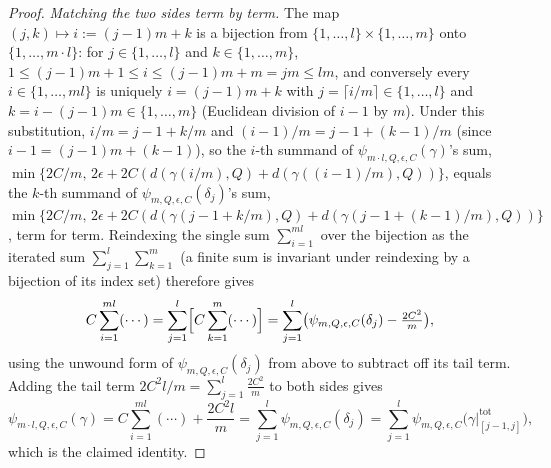 \begin{proof}
  \emph{Matching the two sides term by term.} The map $(j,k) \mapsto i := (j-1)m+k$ is a bijection
  from $\{1,\dotsc,l\}\times\{1,\dotsc,m\}$ onto $\{1,\dotsc,m\cdot l\}$: for $j\in\{1,\dotsc,l\}$
  and $k\in\{1,\dotsc,m\}$, $1 \le (j-1)m+1 \le i \le (j-1)m+m = jm \le lm$, and conversely every
  $i\in\{1,\dotsc,ml\}$ is uniquely $i=(j-1)m+k$ with $j = \lceil i/m \rceil \in \{1,\dotsc,l\}$ and
  $k = i-(j-1)m \in \{1,\dotsc,m\}$ (Euclidean division of $i-1$ by $m$). Under this substitution,
  $i/m = j-1+k/m$ and $(i-1)/m = j-1+(k-1)/m$ (since $i-1=(j-1)m+(k-1)$), so the $i$-th summand of
  $\psi_{m\cdot l,Q,\epsilon,C}(\gamma)$'s sum,
  $\min\{2C/m,\, 2\epsilon+2C(d(\gamma(i/m),Q)+d(\gamma((i-1)/m),Q))\}$, equals the $k$-th summand of
  $\psi_{m,Q,\epsilon,C}(\delta_j)$'s sum,
  $\min\{2C/m,\,2\epsilon+2C(d(\gamma(j-1+k/m),Q)+d(\gamma(j-1+(k-1)/m),Q))\}$, term for term.
  Reindexing the single sum $\sum_{i=1}^{ml}$ over the bijection as the iterated sum
  $\sum_{j=1}^l\sum_{k=1}^m$ (a finite sum is invariant under reindexing by a bijection of its index
  set) therefore gives
  \[
    C\sum_{i=1}^{ml}(\cdots) = \sum_{j=1}^l \Bigl[C\sum_{k=1}^m(\cdots)\Bigr]
    = \sum_{j=1}^l \bigl(\psi_{m,Q,\epsilon,C}(\delta_j) - \tfrac{2C^2}{m}\bigr)
    ,
  \]
  using the unwound form of $\psi_{m,Q,\epsilon,C}(\delta_j)$ from above to subtract off its tail
  term. Adding the tail term $2C^2l/m = \sum_{j=1}^l \tfrac{2C^2}{m}$ to both sides gives
  \[
    \psi_{m\cdot l,Q,\epsilon,C}(\gamma) = C\sum_{i=1}^{ml}(\cdots) + \frac{2C^2l}{m}
    = \sum_{j=1}^l \psi_{m,Q,\epsilon,C}(\delta_j)
    = \sum_{j=1}^l \psi_{m,Q,\epsilon,C}\bigl(\gamma|^{\mathrm{tot}}_{[j-1,j]}\bigr)
    ,
  \]
  which is the claimed identity.
\end{proof}
